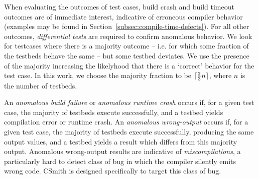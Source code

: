 When evaluating the outcomes of test cases, build crash and build timeout outcomes are of immediate interest, indicative of erroneous compiler behavior (examples may be found in Section~\ref{subsec:compile-time-defects}). For all other outcomes, \emph{differential tests} are required to confirm anomalous behavior. We look for testcases where there is a majority outcome -- i.e. for which some fraction of the testbeds behave the same -- but some testbed deviates. We use the presence of the majority increasing the likelyhood that there is a `correct' behavior for the test case. In this work, we choose the majority fraction to be $\lceil\frac{2}{3}n\rceil$, where $n$ is the number of testbeds.

An \emph{anomalous build failure} or \emph{anomalous runtime crash} occurs if, for a given test case, the majority of testbeds execute successfully, and a testbed yields compilation error or runtime crash.
An \emph{anomalous wrong-output} occurs if, for a given test case, the majority of testbeds execute successfully, producing the same output values, and a testbed yields a result which differs from this majority output. Anomalous wrong-output results are indicative of \emph{miscompilations}, a particularly hard to detect class of bug in which the compiler silently emits wrong code. CSmith is designed specifically to target this class of bug.


%



